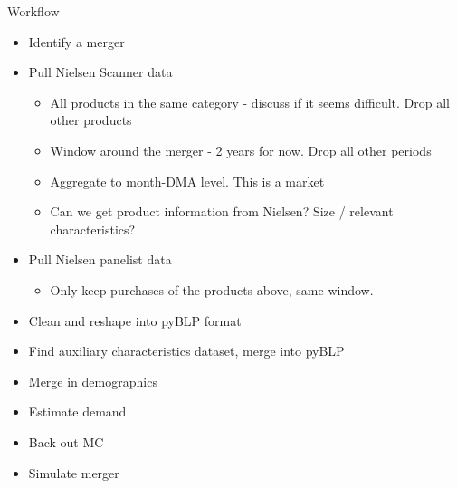 Workflow
\begin{itemize}
	\item Identify a merger
	\item Pull Nielsen Scanner data
	\begin{itemize}	
		\item All products in the same category - discuss if it seems difficult. Drop all other products
		\item Window around the merger - 2 years for now. Drop all other periods
		\item Aggregate to month-DMA level. This is a market
		\item Can we get product information from Nielsen? Size / relevant characteristics?
	\end{itemize}
	\item Pull Nielsen panelist data
	\begin{itemize}	
		\item Only keep purchases of the products above, same window.
	\end{itemize}
	\item Clean and reshape into pyBLP format
	\item Find auxiliary characteristics dataset, merge into pyBLP
	\item Merge in demographics
	\item Estimate demand
	\item Back out MC
	\item Simulate merger

\end{itemize}

